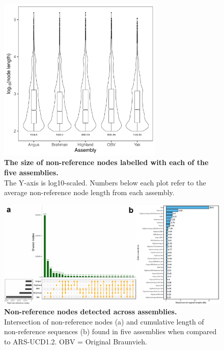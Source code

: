 \documentclass[../main.tex]{subfiles}
\begin{document}
\begin{flushleft}
\begin{figure}[!htb]
    \centering
    \includegraphics[width=0.7\textwidth]{paper3/supplement/sp43.pdf}
    \caption[Non-reference nodes length]{\textbf{The size of non-reference nodes labelled with each of the five assemblies.} \\
    \small{The Y-axis is log10-scaled. Numbers below each plot refer to the average non-reference node length from each assembly. }}
    \label{sup_fig:s43}
\end{figure}

\newpage

\begin{landscape}
\begin{figure}[!htb]
    \centering
    \includegraphics[width=1.5\textwidth]{paper3/supplement/sp44.pdf}
    \caption[Sharing of the non-reference nodes]{\textbf{Non-reference nodes detected across assemblies.} \\
    \small{Intersection of non-reference nodes (a) and cumulative length of non-reference sequences (b) found in five assemblies when compared to ARS-UCD1.2. OBV = Original Braunvieh.}}
    \label{sup_fig:s44}
\end{figure}
\end{landscape}


\end{flushleft}
\end{document}

